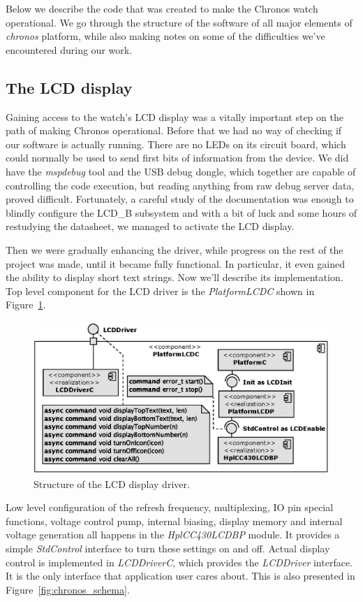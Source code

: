 Below we describe the code that was created to make the Chronos watch operational. We go through the structure of the software of all major elements of \emph{chronos} platform, while also making notes on some of the difficulties we've encountered during our work.

\subsection{The LCD display}
Gaining access to the watch's LCD display was a vitally important step on the path of making Chronos operational.
Before that we had no way of checking if our software is actually running. There are no LEDs on its circuit board, which could normally be used to send first bits of information from the device. We did have the \emph{mspdebug} tool and the USB debug dongle, which together are capable of controlling the code execution, but reading anything from raw debug server data, proved difficult. Fortunately, a careful study of the documentation was enough to blindly configure the LCD\_B subsystem and with a bit of luck and some hours of restudying the datasheet, we managed to activate the LCD display.

Then we were gradually enhancing the driver, while progress on the rest of the project was made, until it became fully functional. In particular, it even gained the ability to display short text strings. Now we'll describe its implementation. Top level component for the LCD driver is the \emph{PlatformLCDC} shown in Figure~\ref{fig:platformc_lcd_c}.
\begin{figure}[h]
  \centering
  \includegraphics{diagrams/platform_lcd_c.eps}
  \caption{Structure of the LCD display driver.}
  \label{fig:platformc_lcd_c}
\end{figure}
Low level configuration of the refresh frequency, multiplexing, IO pin special functions, voltage control pump, internal biasing, display memory and internal voltage generation all happens in the \emph{HplCC430LCDBP} module. It provides a simple \emph{StdControl} interface to turn these settings on and off. Actual display control is implemented in \emph{LCDDriverC}, which provides the \emph{LCDDriver} interface. It is the only interface that application user cares about. This is also presented in Figure~\ref{fig:chronos_schema}.


